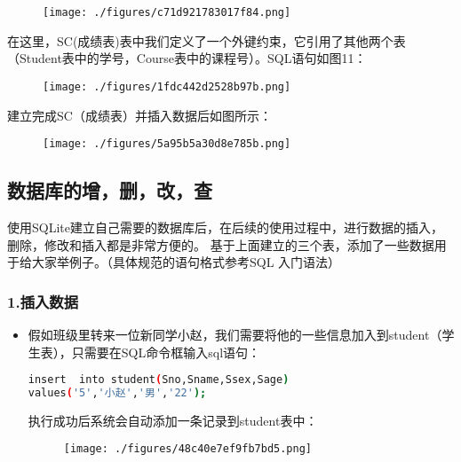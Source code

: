 \begin{figure}[ht]
\centering
\texttt{[image: ./figures/c71d921783017f84.png]}
\caption{} \label{fig_SQLint_10}
\end{figure}

在这里，SC(成绩表)表中我们定义了一个外键约束，它引用了其他两个表（Student表中的学号，Course表中的课程号）。SQL语句如图11：
\begin{figure}[ht]
\centering
\texttt{[image: ./figures/1fdc442d2528b97b.png]}
\caption{} \label{fig_SQLint_11}
\end{figure}

建立完成SC（成绩表）并插入数据后如图所示：
\begin{figure}[ht]
\centering
\texttt{[image: ./figures/5a95b5a30d8e785b.png]}
\caption{} \label{fig_SQLint_12}
\end{figure}

\subsection{数据库的增，删，改，查}
使用SQLite建立自己需要的数据库后，在后续的使用过程中，进行数据的插入，删除，修改和插入都是非常方便的。
基于上面建立的三个表，添加了一些数据用于给大家举例子。（具体规范的语句格式参考SQL 入门语法）
\subsubsection{1.插入数据}

\begin{itemize}
\item 假如班级里转来一位新同学小赵，我们需要将他的一些信息加入到student（学生表），只需要在SQL命令框输入sql语句：

\begin{lstlisting}[language=bash]
insert  into student(Sno,Sname,Ssex,Sage)
values('5','小赵','男','22');
\end{lstlisting}
执行成功后系统会自动添加一条记录到student表中：
\begin{figure}[ht]
\centering
\texttt{[image: ./figures/48c40e7ef9fb7bd5.png]}
\caption{} \label{fig_SQLint_13}
\end{figure}
\end{itemize}

